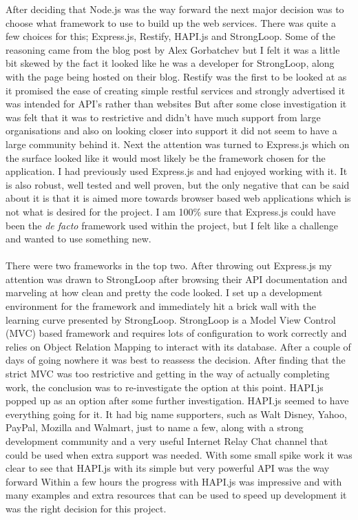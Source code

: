 After deciding that Node.js was the way forward the next major decision was to choose what framework to use to build up the web services. There was quite a few choices for this; Express.js, Restify, HAPI.js and StrongLoop. Some of the reasoning came from the blog post by Alex Gorbatchev \cite{AlexGorbatchev:CompairingExpressRestifyHapLoopBack:2015:online} but I felt it was a little bit skewed by the fact it looked like he was a developer for StrongLoop, along with the page being hosted on their blog. Restify was the first to be looked at as it promised the ease of creating simple restful services and strongly advertised it was intended for API's rather than websites But after some close investigation it was felt that it was to restrictive and didn't have much support from large organisations and also on looking closer into support it did not seem to have a large community behind it. Next the attention was turned to Express.js which on the surface looked like it would most likely be the framework chosen for the application. I had previously used Express.js and had enjoyed working with it. It is also robust, well tested and well proven, but the only negative that can be said about it is that it is aimed more towards browser based web applications which is not what is desired for the project. I am 100\% sure that Express.js could have been the \textit{de facto} framework used within the project, but I felt like a challenge and wanted to use something new.\\
\\
There were two frameworks in the top two. After throwing out Express.js my attention was drawn to StrongLoop after browsing their API documentation and marveling at how clean and pretty the code looked. I set up a development environment for the framework and immediately hit a brick wall with the learning curve presented by StrongLoop. StrongLoop is a Model View Control (MVC) based framework and requires lots of configuration to work correctly and relies on Object Relation Mapping to interact with its database. After a couple of days of going nowhere it was best to reassess the decision. After finding that the strict MVC was too restrictive and getting in the way of actually completing work, the conclusion was to re-investigate the option at this point. HAPI.js popped up as an option after some further investigation. HAPI.js seemed to have everything going for it. It had big name supporters, such as Walt Disney, Yahoo, PayPal, Mozilla and Walmart, just to name a few, along with a strong development community and a very useful Internet Relay Chat channel that could be used when extra support was needed. With some small spike work it was clear to see that HAPI.js with its simple but very powerful API was the way forward Within a few hours the progress with HAPI.js was impressive and with many examples and extra resources that can be used to speed up development it was the right decision for this project.

